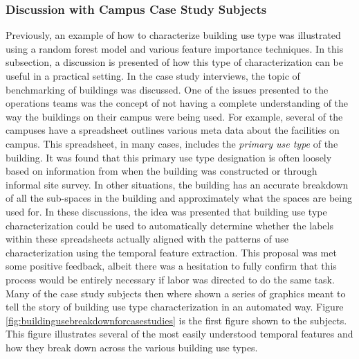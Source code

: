 \subsubsection{Discussion with Campus Case Study Subjects}
\label{sec:buildinguseclassificationdiscussion}

Previously, an example of how to characterize building use type was illustrated using a random forest model and various feature importance techniques. In this subsection, a discussion is presented of how this type of characterization can be useful in a practical setting. In the case study interviews, the topic of benchmarking of buildings was discussed. One of the issues presented to the operations teams was the concept of not having a complete understanding of the way the buildings on their campus were being used. For example, several of the campuses have a spreadsheet outlines various meta data about the facilities on campus. This spreadsheet, in many cases, includes the \emph{primary use type} of the building. It was found that this primary use type designation is often loosely based on information from when the building was constructed or through informal site survey. In other situations, the building has an accurate breakdown of all the sub-spaces in the building and approximately what the spaces are being used for. In these discussions, the idea was presented that building use type characterization could be used to automatically determine whether the labels within these spreadsheets actually aligned with the patterns of use characterization using the temporal feature extraction. This proposal was met some positive feedback, albeit there was a hesitation to fully confirm that this process would be entirely necessary if labor was directed to do the same task. Many of the case study subjects then where shown a series of graphics meant to tell the story of building use type characterization in an automated way. Figure \ref{fig:buildingusebreakdownforcasestudies} is the first figure shown to the subjects. This figure illustrates several of the most easily understood temporal features and how they break down across the various building use types.

